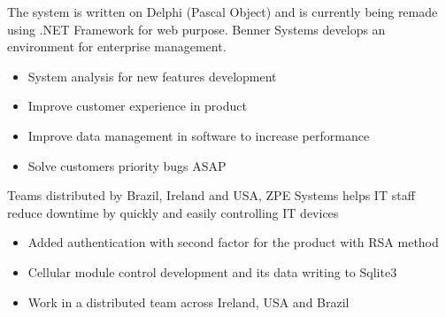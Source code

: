 \documentclass[10pt,a4paper]{altacv}
\begin{document}

\begin{fullwidth}

	\makecvheader{}

\end{fullwidth}


The system is written on Delphi (Pascal Object) and is currently being remade using .NET Framework for web purpose. Benner Systems develops an environment for enterprise management.
\begin{itemize}
\item System analysis for new features development
\item Improve customer experience in product
\item Improve data management in software to increase performance
\item Solve customers priority bugs ASAP
\end{itemize}

\divider{}

Teams distributed by Brazil, Ireland and USA, ZPE Systems helps IT staff reduce downtime by quickly and easily controlling IT devices
\begin{itemize}
\item Added authentication with second factor for the product with RSA method
\item Cellular module control development and its data writing to Sqlite3
\item Work in a distributed team across Ireland, USA and Brazil
\end{itemize}
\end{document}
